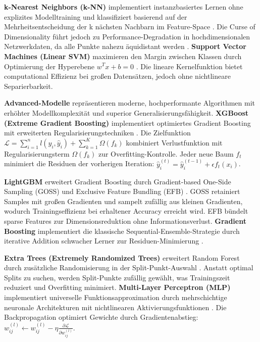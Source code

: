 \documentclass[11pt,a4paper]{article}
\begin{document}
    \textbf{k-Nearest Neighbors (k-NN)} implementiert instanzbasiertes Lernen ohne explizites Modelltraining und klassifiziert basierend auf der Mehrheitsentscheidung der k nächsten Nachbarn im Feature-Space \parencite{Bishop2006}. Die Curse of Dimensionality führt jedoch zu Performance-Degradation in hochdimensionalen Netzwerkdaten, da alle Punkte nahezu äquidistant werden \parencite{Hastie2009}. \textbf{Support Vector Machines (Linear SVM)} maximieren den Margin zwischen Klassen durch Optimierung der Hyperebene $w^T x + b = 0$ \parencite{Platt1999}. Die lineare Kernelfunktion bietet computational Effizienz bei großen Datensätzen, jedoch ohne nichtlineare Separierbarkeit.

    \textbf{Advanced-Modelle} repräsentieren moderne, hochperformante Algorithmen mit erhöhter Modellkomplexität und superior Generalisierungsfähigkeit. \textbf{XGBoost (Extreme Gradient Boosting)} implementiert optimiertes Gradient Boosting mit erweiterten Regularisierungstechniken \parencite{Hastie2009}. Die Zielfunktion $\mathcal{L} = \sum_{i=1}^{n} l(y_i, \hat{y}_i) + \sum_{k=1}^{K} \Omega(f_k)$ kombiniert Verlustfunktion mit Regularisierungsterm $\Omega(f_k)$ zur Overfitting-Kontrolle. Jeder neue Baum $f_t$ minimiert die Residuen der vorherigen Iteration: $\hat{y}_i^{(t)} = \hat{y}_i^{(t-1)} + \epsilon f_t(x_i)$.

    \textbf{LightGBM} erweitert Gradient Boosting durch Gradient-based One-Side Sampling (GOSS) und Exclusive Feature Bundling (EFB) \parencite{Zhou2020}. GOSS retainiert Samples mit großen Gradienten und sampelt zufällig aus kleinen Gradienten, wodurch Trainingseffizienz bei erhaltener Accuracy erreicht wird. EFB bündelt sparse Features zur Dimensionsreduktion ohne Informationsverlust. \textbf{Gradient Boosting} implementiert die klassische Sequential-Ensemble-Strategie durch iterative Addition schwacher Lerner zur Residuen-Minimierung \parencite{Hastie2009}.

    \textbf{Extra Trees (Extremely Randomized Trees)} erweitert Random Forest durch zusätzliche Randomisierung in der Split-Punkt-Auswahl \parencite{Hastie2009}. Anstatt optimal Splits zu suchen, werden Split-Punkte zufällig gewählt, was Trainingszeit reduziert und Overfitting minimiert. \textbf{Multi-Layer Perceptron (MLP)} implementiert universelle Funktionsapproximation durch mehrschichtige neuronale Architekturen mit nichtlinearen Aktivierungsfunktionen \parencite{Goodfellow2016}. Die Backpropagation optimiert Gewichte durch Gradientenabstieg: $w_{ij}^{(l)} \leftarrow w_{ij}^{(l)} - \eta \frac{\partial \mathcal{L}}{\partial w_{ij}^{(l)}}$.
\end{document}
